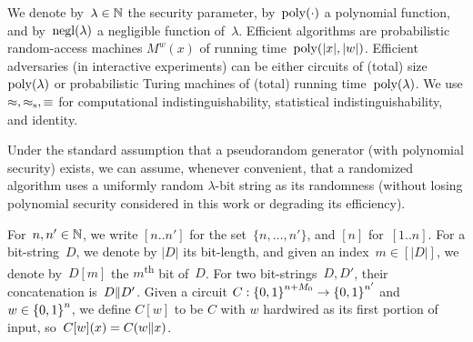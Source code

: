 We denote by~${\lambda\in{\mathbb{N}}}$ the security parameter,
by~$\operatorname{poly}({\cdot})$ a polynomial function, and
by~$\operatorname{negl}(\lambda)$ a negligible function of~$\lambda$.
Efficient algorithms are probabilistic random-access machines $M^w(x)$ of running time~$\operatorname{poly}(|x|,|w|)$.
Efficient adversaries (in interactive experiments) can be either circuits of (total) size~$\operatorname{poly}(\lambda)$ or probabilistic Turing machines of (total) running time~$\operatorname{poly}(\lambda)$.
We use $\approx,\approx_{\textup{s}},\equiv$ for computational indistinguishability, statistical indistinguishability, and identity.

Under the standard assumption that a pseudorandom generator (with polynomial security) exists,
we can assume, whenever convenient, that a randomized algorithm uses a uniformly random $\lambda$-bit string as its randomness (without losing polynomial security considered in this work or degrading its efficiency).

For~${n,n'\in{\mathbb{N}}}$, we write $[n..n']$ for the set~$\{n,\dots,n'\}$,
and $[n]$ for~$[1..n]$.
For a bit-string~$D$, we denote by $|D|$ its bit-length,
and given an index~${m\in[|D|]}$, we denote by~$D[m]$ the $m$\textsuperscript{th} bit of~$D$.
For two bit-strings~$D,D'$, their concatenation is~${D{\parallel} D'}$.
Given a circuit ${C:{\{0,1\}}^{n+M_0}\to{\{0,1\}}^{n'}}$ and ${w\in{\{0,1\}}^n}$, we define $C[w]$ to be $C$ with $w$ hardwired as its first portion of input,
so~${C[w](x)=C(w{\parallel} x)}$.
